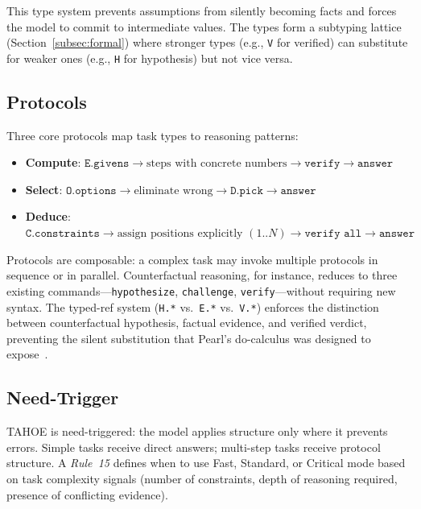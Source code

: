 \documentclass[11pt,a4paper]{article}
\begin{document}
This type system prevents assumptions from silently becoming facts and forces the model to commit to intermediate values.
The types form a subtyping lattice (Section~\ref{subsec:formal}) where stronger types (e.g., \texttt{V} for verified) can substitute for weaker ones (e.g., \texttt{H} for hypothesis) but not vice versa.

\subsection{Protocols}
\label{subsec:protocols}

Three core protocols map task types to reasoning patterns:

\begin{itemize}[nosep,leftmargin=*]
    \item \textbf{Compute}: $\texttt{E.givens} \to \text{steps with concrete numbers} \to \texttt{verify} \to \texttt{answer}$
    \item \textbf{Select}: $\texttt{O.options} \to \text{eliminate wrong} \to \texttt{D.pick} \to \texttt{answer}$
    \item \textbf{Deduce}: $\texttt{C.constraints} \to \text{assign positions explicitly } (1..N) \to \texttt{verify all} \to \texttt{answer}$
\end{itemize}

Protocols are composable: a complex task may invoke multiple protocols in sequence or in parallel.
Counterfactual reasoning, for instance, reduces to three existing commands---\texttt{hypothesize}, \texttt{challenge}, \texttt{verify}---without requiring new syntax.
The typed-ref system (\texttt{H.*} vs.\ \texttt{E.*} vs.\ \texttt{V.*}) enforces the distinction between counterfactual hypothesis, factual evidence, and verified verdict, preventing the silent substitution that Pearl's do-calculus was designed to expose~\cite{pearl2009causality}.

\subsection{Need-Trigger}
\label{subsec:need-trigger}

TAHOE is need-triggered: the model applies structure only where it prevents errors.
Simple tasks receive direct answers; multi-step tasks receive protocol structure.
A \emph{Rule~15} defines when to use Fast, Standard, or Critical mode based on task complexity signals (number of constraints, depth of reasoning required, presence of conflicting evidence).
\end{document}
